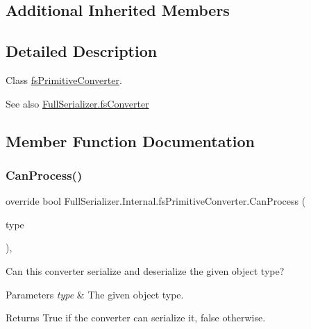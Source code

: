 \subsection*{Additional Inherited Members}


\subsection{Detailed Description}
Class \hyperlink{class_full_serializer_1_1_internal_1_1fs_primitive_converter}{fs\+Primitive\+Converter}. 

\begin{DoxySeeAlso}{See also}
\hyperlink{class_full_serializer_1_1fs_converter}{Full\+Serializer.\+fs\+Converter}


\end{DoxySeeAlso}


\subsection{Member Function Documentation}
\mbox{\label{class_full_serializer_1_1_internal_1_1fs_primitive_converter_a07017626af98ba7a48a3947b7d49a08c}} 
\subsubsection{\texorpdfstring{Can\+Process()}{CanProcess()}}
{\footnotesize\ttfamily override bool Full\+Serializer.\+Internal.\+fs\+Primitive\+Converter.\+Can\+Process (\begin{DoxyParamCaption}\item[{Type}]{type }\end{DoxyParamCaption})\hspace{0.3cm}{\ttfamily [inline]}, {\ttfamily [virtual]}}



Can this converter serialize and deserialize the given object type? 


\begin{DoxyParams}{Parameters}
{\em type} & The given object type.\\
\hline
\end{DoxyParams}
\begin{DoxyReturn}{Returns}
True if the converter can serialize it, false otherwise.
\end{DoxyReturn}


